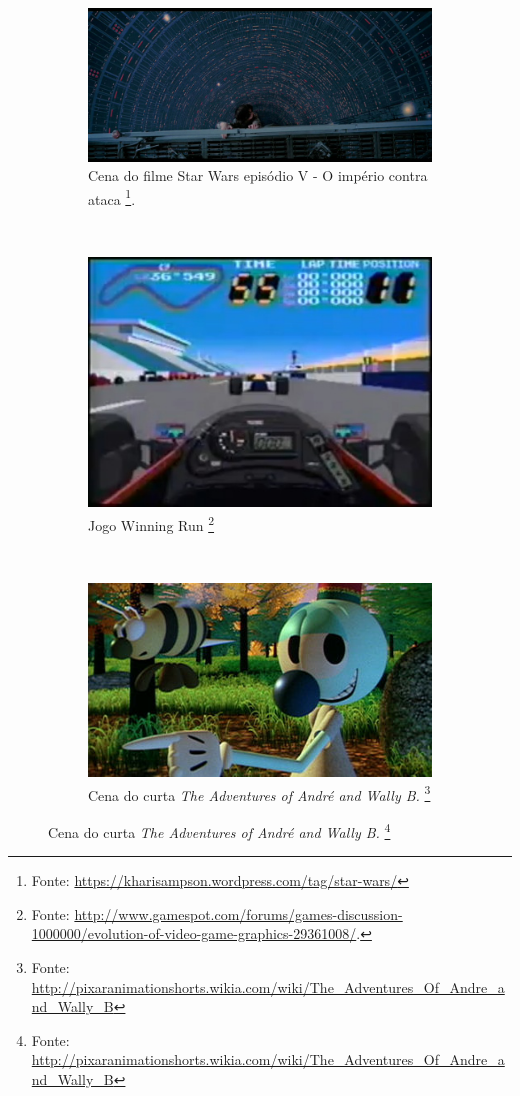 \begin{savenotes}
 \begin{figure}[H]
    \centering
    \begin{subfigure}[t]{0.5\textwidth}
        \centerline{\includegraphics[width=.9\textwidth]{img/starwars}}
        \caption{Cena do filme Star Wars episódio V - O império contra ataca \footnote{Fonte: \url{https://kharisampson.wordpress.com/tag/star-wars/}}.}
    \end{subfigure}
    ~
    \begin{subfigure}[t]{0.3\textwidth}
        \centerline{\includegraphics[width=.9\textwidth]{img/winning_run}}
        \caption{Jogo Winning Run \footnote{Fonte: \url{http://www.gamespot.com/forums/games-discussion-1000000/evolution-of-video-game-graphics-29361008/}.}}
    \end{subfigure}
    ~
    \begin{subfigure}[t]{0.3\textwidth}
        \centerline{\includegraphics[width=.9\textwidth]{img/curtapixar}}
        \caption{Cena do curta \emph{The Adventures of André and Wally B.} \footnote{Fonte: \url{http://pixaranimationshorts.wikia.com/wiki/The_Adventures_Of_Andre_and_Wally_B}}}
    \end{subfigure}


\end{figure}
\end{savenotes}
